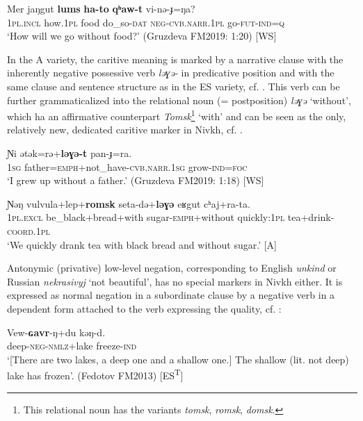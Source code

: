 \documentclass[output=paper,colorlinks,citecolor=brown]{langscibook}
\begin{document}
\ea\label{ex:niv:136}
    \gll Mer jaŋgut \textbf{lums} \textbf{ha-to} \textbf{qʰaw-t} vi-nə{}-ɟ=ŋa? \\ 
         \textsc{1pl}.\textsc{incl} how.\textsc{1pl} food do\_so-\textsc{dat} \textsc{neg-cvb.narr.1pl} go-\textsc{fut-ind=q}\\
    \glt ‘How will we go without food?’ (Gruzdeva FM2019: 1:20) [WS]
\z 

In the A variety, the caritive meaning is marked by a narrative clause with the inherently negative possessive verb \textit{ləɣə{}-} in predicative position and with the same clause and sentence structure as in the ES variety, cf. . This verb can be further grammaticalized into the relational noun (= postposition) \textit{ləɣə} ‘without’, which ha an affirmative counterpart \textit{Tomsk}\footnote{This relational noun has the variants \textit{tomsk}, \textit{romsk}, \textit{domsk}.} ‘with’ and can be seen as the only, relatively new, dedicated caritive marker in Nivkh, cf. .

\ea\label{ex:niv:137}
    \gll Ɲi ətək=rə+\textbf{ləɣə{}-t} pan-ɟ=ra. \\ 
         \textsc{1sg} father=\textsc{emph}+not\_have\textsc{{}-cvb.narr.1sg} grow-\textsc{ind=foc} \\
    \glt ‘I grew up without a father.’ (Gruzdeva FM2019: 1:18) [WS]
\z 

\ea\label{ex:niv:138}
    \gll Ɲəŋ vulvula+lep+\textbf{romsk} seta-də+\textbf{ləɣə}  eʁgut cʰaj+ra-ta. \\ 
         \textsc{1pl.excl} be\_black+bread+with sugar-\textsc{emph}+without quickly:\textsc{1pl} tea+drink-\textsc{coord.1pl} \\
    \glt ‘We quickly drank tea with black bread and without sugar.’ \citep[161]{Panfilov1965} [A]
\z 

Antonymic (privative) low-level negation, corresponding to English \textit{unkind} or Russian \textit{nekrasivyj} ‘not beautiful’, has no special markers in Nivkh either. It is expressed as normal negation in a subordinate clause by a negative verb in a dependent form attached to the verb expressing the quality, cf. :

\ea\label{ex:niv:139}
    \gll Vew-\textbf{ɢavr}{}-ŋ+du kəŋ-d. \\ 
         deep-\textsc{neg-nmlz}+lake freeze-\textsc{ind} \\
    \glt ‘[There are two lakes, a deep one and a shallow one.] The shallow (lit. not deep) lake has frozen’. (Fedotov FM2013) [ES\textsuperscript{T}]
\z 
\end{document}
